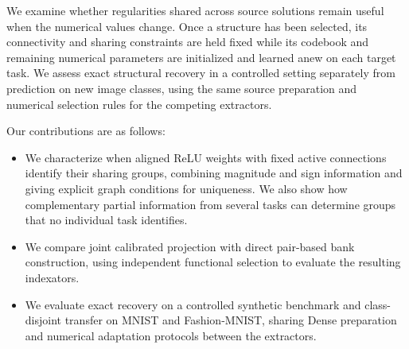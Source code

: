 We examine whether regularities shared across source solutions remain
useful when the numerical values change. Once a structure has been
selected, its connectivity and sharing constraints are held fixed while
its codebook and remaining numerical parameters are initialized and
learned anew on each target task. We assess exact structural recovery
in a controlled setting separately from prediction on new image classes,
using the same source preparation and numerical selection rules for
the competing extractors.

Our contributions are as follows:
\begin{itemize}
    \item We characterize when aligned ReLU weights with fixed active connections identify their sharing groups, combining magnitude and sign information and giving explicit graph conditions for uniqueness. We also show how complementary partial information from several tasks can determine groups that no individual task identifies.
    \item We compare joint calibrated projection with direct pair-based bank construction, using independent functional selection to evaluate the resulting indexators.
    \item We evaluate exact recovery on a controlled synthetic benchmark and class-disjoint transfer on MNIST and Fashion-MNIST, sharing Dense preparation and numerical adaptation protocols between the extractors.
\end{itemize}
